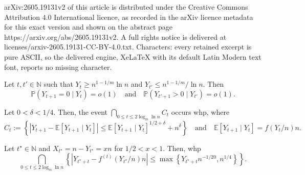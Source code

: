 \documentclass[10pt,a4paper]{amsart}
\newcommand{\Prob}{\mathbb{P}}
\begin{document}
arXiv:2605.19131v2 of this article is distributed under the Creative Commons Attribution 4.0 International licence, as recorded in the arXiv licence metadata for this exact version and shown on the abstract page https://arxiv.org/abs/2605.19131v2. A full rights notice is delivered at licenses/arxiv-2605.19131-CC-BY-4.0.txt. Characters: every retained excerpt is pure ASCII, so the delivered engine, XeLaTeX with its default Latin Modern text font, reports no missing character.
\begin{lemma}\label{lem: threshold sqrt(n)}
    Let $t, t' \in \mathbb{N}$ such that $Y_t \geq n^{1-1/m}\ln n$ and $Y_{t'} \leq n^{1-1/m}/\ln n$. Then
    \[
    \Prob(Y_{t+1} = 0 \mid Y_t) = o(1)
    \quad 
    \text{and}
    \quad
    \Prob(Y_{t'+1} > 0\mid Y_{t'}) = o(1).
    \]
\end{lemma}

\begin{lemma}\label{lem: aux lem 2.5}
Let $0 < \delta < 1/4$. Then, the event $\bigcap_{0 \le t \le 2\log_m\ln n}C_t$ occurs whp, where
\[
    C_t := \left \{\left|Y_{t+1} - \mathbb{E}[Y_{t+1}\mid Y_t] \right| \leq  \mathbb{E}[Y_{t+1}\mid Y_t]^{1/2+\delta} + n^\delta \right \}
    \quad
    \text{and}
    \quad
    \mathbb{E}[Y_{t+1}\mid Y_t] = f(Y_t/n)n.
\]
\end{lemma}

\begin{lemma}
\label{lem: ending phase concentration}
Let $t^\star\in\mathbb{N}$ and $X_{t^\star}=n-Y_{t^\star} = x n$ for $1/2<x<1$.  Then, whp
\[
    \bigcap_{0 \leq t \leq 2 \log_m\ln n} \left\{\left|Y_{t^\star+t} - f^{(t)}(Y_{t^\star}/n)n \right|\leq \max\left\{Y_{t^\star+t}n^{-1/20}, n^{1/4}\right\} \right\}.
\]
\end{lemma}
\end{document}
